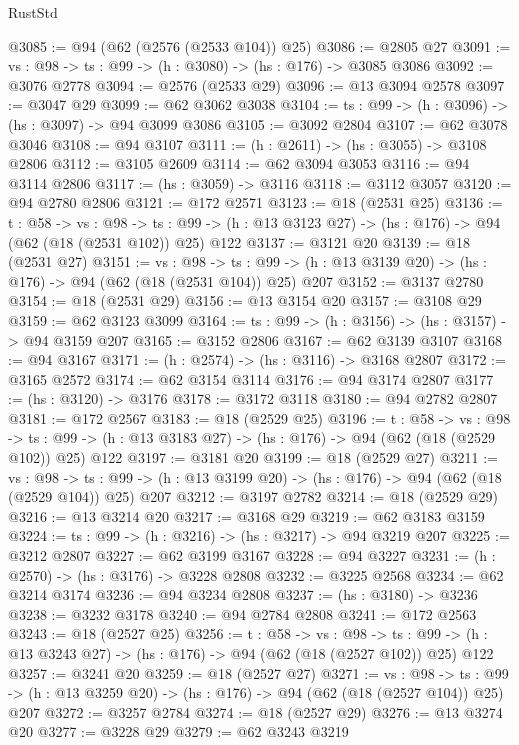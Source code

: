 \begin{lexlean}{RustStd}
\begin{coremodule}
{\begin{coremodule}
{{{{{{{{{@3085 := @94 (@62 (@2576 (@2533 @104)) @25)
@3086 := @2805 @27
@3091 := {vs : @98} -> {ts : @99} -> (h : @3080) -> (hs : @176) -> @3085 @3086
@3092 := @3076 @2778
@3094 := @2576 (@2533 @29)
@3096 := @13 @3094 @2578
@3097 := @3047 @29
@3099 := @62 @3062 @3038
@3104 := {ts : @99} -> (h : @3096) -> (hs : @3097) -> @94 @3099 @3086
@3105 := @3092 @2804
@3107 := @62 @3078 @3046
@3108 := @94 @3107
@3111 := (h : @2611) -> (hs : @3055) -> @3108 @2806
@3112 := @3105 @2609
@3114 := @62 @3094 @3053
@3116 := @94 @3114 @2806
@3117 := (hs : @3059) -> @3116
@3118 := @3112 @3057
@3120 := @94 @2780 @2806
@3121 := @172 @2571
@3123 := @18 (@2531 @25)
@3136 := {t : @58} ->
  {vs : @98} ->
  {ts : @99} -> (h : @13 @3123 @27) -> (hs : @176) -> @94 (@62 (@18 (@2531 @102)) @25) @122
@3137 := @3121 @20
@3139 := @18 (@2531 @27)
@3151 := {vs : @98} ->
  {ts : @99} -> (h : @13 @3139 @20) -> (hs : @176) -> @94 (@62 (@18 (@2531 @104)) @25) @207
@3152 := @3137 @2780
@3154 := @18 (@2531 @29)
@3156 := @13 @3154 @20
@3157 := @3108 @29
@3159 := @62 @3123 @3099
@3164 := {ts : @99} -> (h : @3156) -> (hs : @3157) -> @94 @3159 @207
@3165 := @3152 @2806
@3167 := @62 @3139 @3107
@3168 := @94 @3167
@3171 := (h : @2574) -> (hs : @3116) -> @3168 @2807
@3172 := @3165 @2572
@3174 := @62 @3154 @3114
@3176 := @94 @3174 @2807
@3177 := (hs : @3120) -> @3176
@3178 := @3172 @3118
@3180 := @94 @2782 @2807
@3181 := @172 @2567
@3183 := @18 (@2529 @25)
@3196 := {t : @58} ->
  {vs : @98} ->
  {ts : @99} -> (h : @13 @3183 @27) -> (hs : @176) -> @94 (@62 (@18 (@2529 @102)) @25) @122
@3197 := @3181 @20
@3199 := @18 (@2529 @27)
@3211 := {vs : @98} ->
  {ts : @99} -> (h : @13 @3199 @20) -> (hs : @176) -> @94 (@62 (@18 (@2529 @104)) @25) @207
@3212 := @3197 @2782
@3214 := @18 (@2529 @29)
@3216 := @13 @3214 @20
@3217 := @3168 @29
@3219 := @62 @3183 @3159
@3224 := {ts : @99} -> (h : @3216) -> (hs : @3217) -> @94 @3219 @207
@3225 := @3212 @2807
@3227 := @62 @3199 @3167
@3228 := @94 @3227
@3231 := (h : @2570) -> (hs : @3176) -> @3228 @2808
@3232 := @3225 @2568
@3234 := @62 @3214 @3174
@3236 := @94 @3234 @2808
@3237 := (hs : @3180) -> @3236
@3238 := @3232 @3178
@3240 := @94 @2784 @2808
@3241 := @172 @2563
@3243 := @18 (@2527 @25)
@3256 := {t : @58} ->
  {vs : @98} ->
  {ts : @99} -> (h : @13 @3243 @27) -> (hs : @176) -> @94 (@62 (@18 (@2527 @102)) @25) @122
@3257 := @3241 @20
@3259 := @18 (@2527 @27)
@3271 := {vs : @98} ->
  {ts : @99} -> (h : @13 @3259 @20) -> (hs : @176) -> @94 (@62 (@18 (@2527 @104)) @25) @207
@3272 := @3257 @2784
@3274 := @18 (@2527 @29)
@3276 := @13 @3274 @20
@3277 := @3228 @29
@3279 := @62 @3243 @3219
}}}}}}}}}
\end{coremodule}}
\end{coremodule}
\end{lexlean}
